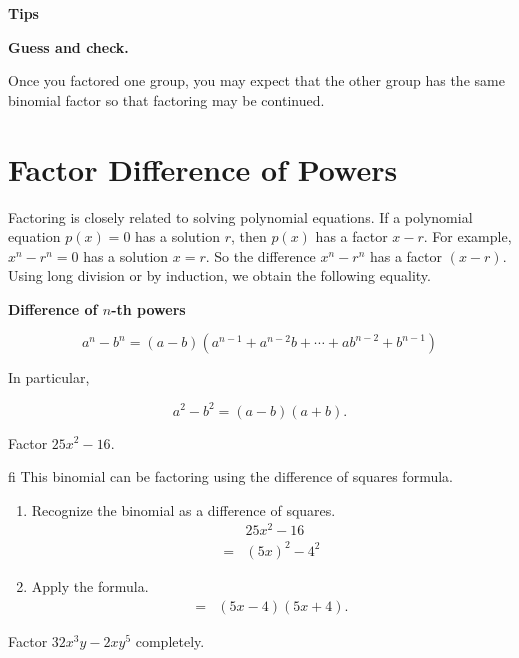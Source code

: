 \documentclass[en,12pt]{elegantbook}
\providecommand{\tightlist}{%
  \setlength{\itemsep}{0pt}\setlength{\parskip}{0pt}}
\newenvironment{rmdtip}{
	\par\noindent
	{
		\makebox[-\width][r]{
			\footnotesize\color{red!90}
            \HandRight
			\hspace*{1pt}
		}
			\textbf{
				\color{second}
				\hspace*{3pt}
				Tips 
			}
    }
    \begin{shaded}
    \sffamily
}{
    \par\medskip\ignorespacesafterend
    \end{shaded}
}
\providecommand{\tightlist}{%
  \setlength{\itemsep}{0pt}\setlength{\parskip}{0pt}}
\let\BeginKnitrBlock\begin \let\EndKnitrBlock\end
\begin{document}
\begin{rmdtip}

\textbf{Guess and check.}

Once you factored one group, you may expect that the other group has the same binomial factor so that factoring may be continued.

\end{rmdtip}

\hypertarget{factor-difference-of-powers}{%
\section{Factor Difference of Powers}\label{factor-difference-of-powers}}

Factoring is closely related to solving polynomial equations. If a polynomial equation \(p(x)=0\) has a solution \(r\), then \(p(x)\) has a factor \(x-r\). For example, \(x^n-r^n=0\) has a solution \(x=r\). So the difference \(x^n-r^n\) has a factor \((x-r)\). Using long division or by induction, we obtain the following equality.

\textbf{Difference of \(n\)-th powers}

\[a^n-b^n=(a-b)(a^{n-1}+a^{n-2}b+\cdots +ab^{n-2}+b^{n-1})\]

In particular,

\[a^2-b^2=(a-b)(a+b).\]

\BeginKnitrBlock{example}
\protect\hypertarget{exm:unnamed-chunk-14}{}{\label{exm:unnamed-chunk-14} }
Factor \(25x^2-16\).
\EndKnitrBlock{example}

\BeginKnitrBlock{solution}
fi{}
This binomial can be factoring using the difference of squares formula.

\begin{enumerate}
\def\labelenumi{\arabic{enumi}.}
\tightlist
\item
  Recognize the binomial as a difference of squares.
  \[\begin{aligned}
  &25x^2-16\\
  =&(5x)^2-4^2
  \end{aligned}
  \]
\item
  Apply the formula.
  \[
  \begin{aligned}
  =&(5x-4)(5x+4).
  \end{aligned}
  \]
\end{enumerate}
\EndKnitrBlock{solution}

\BeginKnitrBlock{example}
\protect\hypertarget{exm:unnamed-chunk-16}{}{\label{exm:unnamed-chunk-16} }
Factor \(32x^3y-2xy^5\) completely.
\EndKnitrBlock{example}
\end{document}
